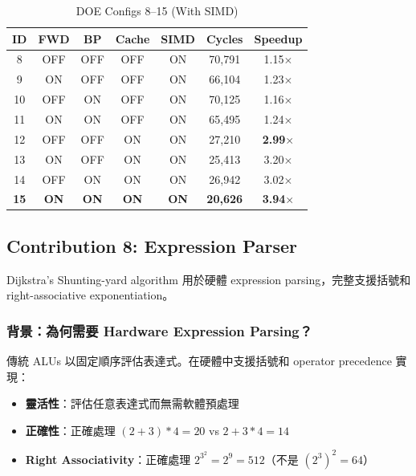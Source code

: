\documentclass[journal]{IEEEtran}
\newcommand{\tagit}[1]{\textit{#1}}
\newcommand{\Goal}{\tagit{目標：}}
\begin{document}
\begin{table}[!tbp]
\centering
\caption{DOE Configs 8--15 (With SIMD)}
\label{tab:doe16b}
\footnotesize
\setlength{\tabcolsep}{3pt}
\begin{tabular}{@{}ccccccc@{}}
\toprule
\textbf{ID} & \textbf{FWD} & \textbf{BP} & \textbf{Cache} & \textbf{SIMD} & \textbf{Cycles} & \textbf{Speedup} \\
\midrule
8 & OFF & OFF & OFF & ON & 70,791 & 1.15$\times$ \\
9 & ON & OFF & OFF & ON & 66,104 & 1.23$\times$ \\
10 & OFF & ON & OFF & ON & 70,125 & 1.16$\times$ \\
11 & ON & ON & OFF & ON & 65,495 & 1.24$\times$ \\
12 & OFF & OFF & ON & ON & 27,210 & \textbf{2.99$\times$} \\
13 & ON & OFF & ON & ON & 25,413 & 3.20$\times$ \\
14 & OFF & ON & ON & ON & 26,942 & 3.02$\times$ \\
\textbf{15} & \textbf{ON} & \textbf{ON} & \textbf{ON} & \textbf{ON} & \textbf{20,626} & \textbf{3.94$\times$} \\
\bottomrule
\end{tabular}
\end{table}

\subsection{Contribution 8: Expression Parser}

 Dijkstra's Shunting-yard algorithm 用於硬體 expression parsing，完整支援括號和 right-associative exponentiation。

\subsubsection{背景：為何需要 Hardware Expression Parsing？}
傳統 ALUs 以固定順序評估表達式。在硬體中支援括號和 operator precedence 實現：
\begin{itemize}
    \item \textbf{靈活性}：評估任意表達式而無需軟體預處理
    \item \textbf{正確性}：正確處理 $(2+3)*4 = 20$ vs $2+3*4 = 14$
    \item \textbf{Right Associativity}：正確處理 $2^{3^2} = 2^9 = 512$（不是 $(2^3)^2 = 64$）
\end{itemize}
\end{document}
